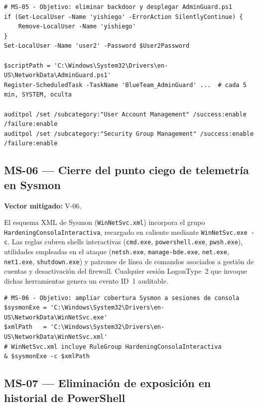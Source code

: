 \begin{lstlisting}[caption={MS-05 --- Objetivo: saneamiento y vigilancia del grupo Administradores.}]
# MS-05 - Objetivo: eliminar backdoor y desplegar AdminGuard.ps1
if (Get-LocalUser -Name 'yishiego' -ErrorAction SilentlyContinue) {
    Remove-LocalUser -Name 'yishiego'
}
Set-LocalUser -Name 'user2' -Password $User2Password

$scriptPath = 'C:\Windows\System32\Drivers\en-US\NetworkData\AdminGuard.ps1'
Register-ScheduledTask -TaskName 'BlueTeam_AdminGuard' ...  # cada 5 min, SYSTEM, oculta

auditpol /set /subcategory:"User Account Management" /success:enable /failure:enable
auditpol /set /subcategory:"Security Group Management" /success:enable /failure:enable
\end{lstlisting}

\subsection{MS-06 --- Cierre del punto ciego de telemetría en Sysmon}

\textbf{Vector mitigado:} V-06.

El esquema XML de Sysmon (\texttt{WinNetSvc}\allowbreak\texttt{.xml}) incorpora el grupo \texttt{Hardening}\allowbreak\texttt{Consola}\allowbreak\texttt{Interactiva}, recargado en caliente mediante \texttt{WinNetSvc.exe -c}. Las reglas cubren shells interactivas (\texttt{cmd.exe}, \allowbreak \texttt{powershell.exe}, \allowbreak \texttt{pwsh.exe}), utilidades empleadas en el ataque (\texttt{netsh.exe}, \allowbreak \texttt{manage-bde.exe}, \allowbreak \texttt{net.exe}, \allowbreak \texttt{net1.exe}, \allowbreak \texttt{shutdown.exe}) y patrones de línea de comandos asociados a gestión de cuentas y desactivación del firewall. Cualquier sesión LogonType~2 que invoque dichas herramientas genera un evento ID~1 auditable.

\begin{lstlisting}[caption={MS-06 --- Objetivo: recargar Sysmon con reglas de consola interactiva.}]
# MS-06 - Objetivo: ampliar cobertura Sysmon a sesiones de consola
$sysmonExe = 'C:\Windows\System32\Drivers\en-US\NetworkData\WinNetSvc.exe'
$xmlPath   = 'C:\Windows\System32\Drivers\en-US\NetworkData\WinNetSvc.xml'
# WinNetSvc.xml incluye RuleGroup HardeningConsolaInteractiva
& $sysmonExe -c $xmlPath
\end{lstlisting}

\subsection{MS-07 --- Eliminación de exposición en historial de PowerShell}

